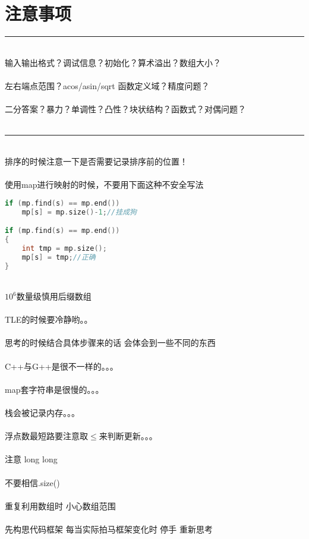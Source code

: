 \section{注意事项}
	\Large
	\hrule\ 
	\\
	输入输出格式？调试信息？初始化？算术溢出？数组大小？\\
	\\
	左右端点范围？acos/asin/sqrt 函数定义域？精度问题？\\
	\\
	二分答案？暴力？单调性？凸性？块状结构？函数式？对偶问题？\\
	\\
	\hrule\
	\\
	排序的时候注意一下是否需要记录排序前的位置！\\
	\\
	使用map进行映射的时候，不要用下面这种不安全写法
	\begin{lstlisting}[language=c++,
    basicstyle=\sf\Large,
    numberstyle=\sf\Large,
    commentstyle=\sf\Large]
if (mp.find(s) == mp.end())
	mp[s] = mp.size()-1;//挂成狗

if (mp.find(s) == mp.end())
{
	int tmp = mp.size();
	mp[s] = tmp;//正确
}
	\end{lstlisting}
	~\\
	$10^{6}$数量级慎用后缀数组\\
	\\
	TLE的时候要冷静哟。。\\
	\\
	思考的时候结合具体步骤来的话 会体会到一些不同的东西\\
	\\
	C++与G++是很不一样的。。。\\
	\\
	map套字符串是很慢的。。。\\ 
	\\
	栈会被记录内存。。。\\
	\\
	浮点数最短路要注意取$\leq$来判断更新。。。\\
	\\
	注意 long long\\
	\\
	不要相信.size()\\
	\\
	重复利用数组时 小心数组范围\\
	\\
	先构思代码框架 每当实际拍马框架变化时 停手 重新思考\\
	\\
